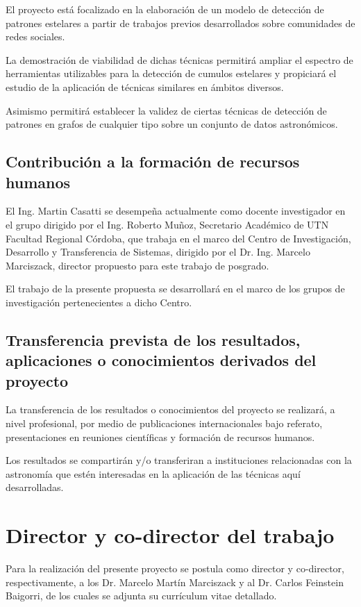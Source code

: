 \documentclass[
	11pt,oneside,a4paper,
	headsepline,footsepline,plainfootsepline,plainheadsepline,
	fleqn,
]{article}
\begin{document}
El proyecto está focalizado en la elaboración de un modelo de detección de patrones estelares a partir de trabajos previos desarrollados sobre comunidades de redes sociales.

La demostración de viabilidad de dichas técnicas permitirá ampliar el espectro de herramientas utilizables para la detección de cumulos estelares y propiciará el estudio de la aplicación de técnicas similares en ámbitos diversos.

Asimismo permitirá establecer la validez de ciertas técnicas de detección de patrones en grafos de cualquier tipo sobre un conjunto de datos astronómicos.

\subsection*{Contribución a la formación de recursos humanos}

El Ing. Martin Casatti se desempeña actualmente como docente investigador en el grupo dirigido por el Ing. Roberto Muñoz, Secretario Académico de UTN Facultad Regional Córdoba, que trabaja en el marco del Centro de Investigación, Desarrollo y Transferencia de Sistemas, dirigido por el Dr. Ing. Marcelo Marciszack, director propuesto para este trabajo de posgrado.

El trabajo de la presente propuesta se desarrollará en el marco de los grupos de investigación pertenecientes a dicho Centro.

\subsection*{Transferencia prevista de los resultados, aplicaciones o conocimientos derivados del
	proyecto}

La transferencia de los resultados o conocimientos del proyecto se realizará, a nivel
profesional, por medio de publicaciones internacionales bajo referato, presentaciones en reuniones científicas y formación de recursos humanos.

Los resultados se compartirán y/o transferiran a instituciones relacionadas con la astronomía que estén interesadas en la aplicación de las técnicas aquí desarrolladas.

\section{Director y co-director del trabajo}

Para la realización del presente proyecto se postula como director y co-director, respectivamente, a los Dr. Marcelo Martín Marciszack y al Dr. Carlos Feinstein Baigorri, de los cuales se adjunta su currículum vitae detallado.
\end{document}
